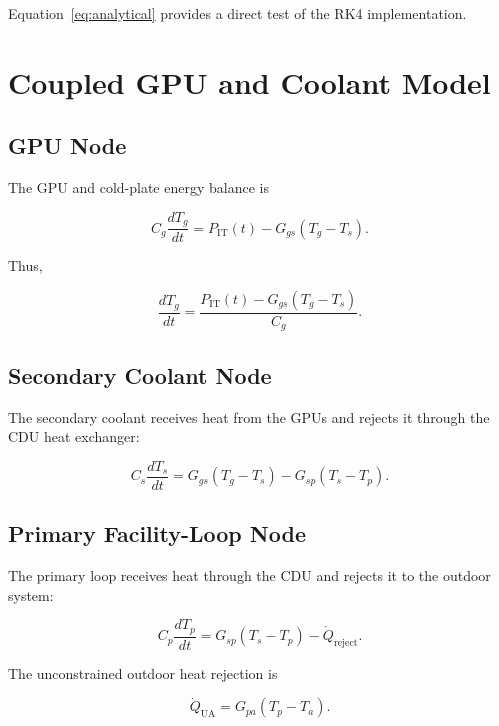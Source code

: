 \documentclass[11pt]{article}
\begin{document}
Equation~\eqref{eq:analytical} provides a direct test of the RK4 implementation.

\section{Coupled GPU and Coolant Model}

\subsection{GPU Node}

The GPU and cold-plate energy balance is

\begin{equation}
C_g\frac{dT_g}{dt}
=P_{\mathrm{IT}}(t)-G_{gs}(T_g-T_s).
\label{eq:gpu}
\end{equation}

Thus,

\begin{equation}
\frac{dT_g}{dt}
=\frac{P_{\mathrm{IT}}(t)-G_{gs}(T_g-T_s)}{C_g}.
\end{equation}

\subsection{Secondary Coolant Node}

The secondary coolant receives heat from the GPUs and rejects it through the CDU
heat exchanger:

\begin{equation}
C_s\frac{dT_s}{dt}
=G_{gs}(T_g-T_s)-G_{sp}(T_s-T_p).
\label{eq:secondary}
\end{equation}

\subsection{Primary Facility-Loop Node}

The primary loop receives heat through the CDU and rejects it to the outdoor system:

\begin{equation}
C_p\frac{dT_p}{dt}
=G_{sp}(T_s-T_p)-\dot Q_{\mathrm{reject}}.
\label{eq:primary}
\end{equation}

The unconstrained outdoor heat rejection is

\begin{equation}
\dot Q_{\mathrm{UA}}
=G_{pa}(T_p-T_a).
\end{equation}
\end{document}

